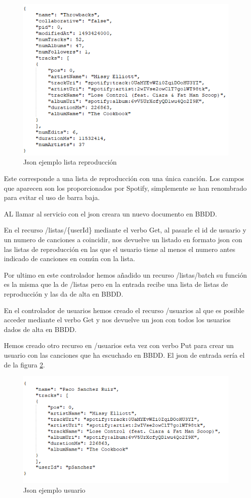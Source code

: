 \documentclass[12pt]{report} %
\begin{document}
\begin{figure}
	\centering
	\includegraphics[width=0.7\linewidth]{imagenes/jsonLista}
	\caption{Json ejemplo lista reproducción}
	\label{fig:jsonlista}
\end{figure}


Este corresponde a una lista de reproducción con una única canción. Los campos que aparecen son los proporcionados por Spotify, simplemente se han renombrado para evitar el uso de barra baja.

AL llamar al servicio con el json creara un nuevo documento en BBDD.

En el recurso /listas/\{userId\} mediante el verbo Get, al pasarle el id de usuario y un numero de canciones a coincidir, nos devuelve un listado en formato json con las listas de reproducción en las que el usuario tiene al menos el numero antes indicado de canciones en común con la lista.

Por ultimo en este controlador hemos añadido un recurso /listas/batch su función es la misma que la de /listas pero en la entrada recibe una lista de listas de reproducción y las da de alta en BBDD.


En el controlador de usuarios hemos creado el recurso /usuarios al que es posible acceder mediante el verbo Get y nos devuelve un json con todos los usuarios dados de alta en BBDD.

Hemos creado otro recurso en /usuarios esta vez con verbo Put para crear un usuario con las canciones que ha escuchado en BBDD. El json de entrada sería el de la figura \ref{fig:jsonusuario}.

\begin{figure}
	\centering
	\includegraphics[width=0.7\linewidth]{imagenes/jsonUsuario}
	\caption{Json ejemplo usuario}
	\label{fig:jsonusuario}
\end{figure}
\end{document}
